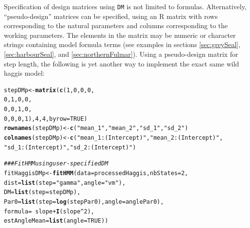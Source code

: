 \documentclass[12pt]{article}\usepackage[]{graphicx}\usepackage[]{xcolor}
\makeatletter
\newcommand{\hlnum}[1]{\textcolor[rgb]{0.686,0.059,0.569}{#1}}%
\newcommand{\hlsng}[1]{\textcolor[rgb]{0.192,0.494,0.8}{#1}}%
\newcommand{\hlcom}[1]{\textcolor[rgb]{0.678,0.584,0.686}{\textit{#1}}}%
\newcommand{\hlopt}[1]{\textcolor[rgb]{0,0,0}{#1}}%
\newcommand{\hldef}[1]{\textcolor[rgb]{0.345,0.345,0.345}{#1}}%
\newcommand{\hlkwb}[1]{\textcolor[rgb]{0.69,0.353,0.396}{#1}}%
\newcommand{\hlkwc}[1]{\textcolor[rgb]{0.333,0.667,0.333}{#1}}%
\newcommand{\hlkwd}[1]{\textcolor[rgb]{0.737,0.353,0.396}{\textbf{#1}}}%
\newenvironment{kframe}{%
 \def\at@end@of@kframe{}%
 \ifinner\ifhmode%
  \def\at@end@of@kframe{\end{minipage}}%
  \begin{minipage}{\columnwidth}%
 \fi\fi%
 \def\FrameCommand##1{\hskip\@totalleftmargin \hskip-\fboxsep
 \colorbox{shadecolor}{##1}\hskip-\fboxsep
     \hskip-\linewidth \hskip-\@totalleftmargin \hskip\columnwidth}%
 \MakeFramed {\advance\hsize-\width
   \@totalleftmargin\z@ \linewidth\hsize
   \@setminipage}}%
 {\par\unskip\endMakeFramed%
 \at@end@of@kframe}
\newenvironment{knitrout}{}{} %
\makeatother
\begin{document}
Specification of design matrices using \verb|DM| is not limited to formulas. Alternatively, ``pseudo-design'' matrices can be specified, using an R matrix with rows corresponding to the natural parameters and columns corresponding to the working parameters. The elements in the matrix may be numeric or character strings containing model formula terms (see examples in sections \ref{sec:greySeal}, \ref{sec:harbourSeal}, and \ref{sec:northernFulmar}). Using a pseudo-design matrix for step length, the following is yet another way to implement the exact same wild haggis model:
\begin{knitrout}
\color{fgcolor}\begin{kframe}
\begin{alltt}
\hldef{stepDMp} \hlkwb{<-} \hlkwd{matrix}\hldef{(}\hlkwd{c}\hldef{(}\hlnum{1}\hldef{,}\hlnum{0}\hldef{,}\hlnum{0}\hldef{,}\hlnum{0}\hldef{,}
                   \hlnum{0}\hldef{,}\hlnum{1}\hldef{,}\hlnum{0}\hldef{,}\hlnum{0}\hldef{,}
                   \hlnum{0}\hldef{,}\hlnum{0}\hldef{,}\hlnum{1}\hldef{,}\hlnum{0}\hldef{,}
                   \hlnum{0}\hldef{,}\hlnum{0}\hldef{,}\hlnum{0}\hldef{,}\hlnum{1}\hldef{),}\hlnum{4}\hldef{,}\hlnum{4}\hldef{,}\hlkwc{byrow}\hldef{=}\hlnum{TRUE}\hldef{)}
\hlkwd{rownames}\hldef{(stepDMp)} \hlkwb{<-} \hlkwd{c}\hldef{(}\hlsng{"mean_1"}\hldef{,}\hlsng{"mean_2"}\hldef{,}\hlsng{"sd_1"}\hldef{,}\hlsng{"sd_2"}\hldef{)}
\hlkwd{colnames}\hldef{(stepDMp)} \hlkwb{<-} \hlkwd{c}\hldef{(}\hlsng{"mean_1:(Intercept)"}\hldef{,}\hlsng{"mean_2:(Intercept)"}\hldef{,}
                      \hlsng{"sd_1:(Intercept)"}\hldef{,}\hlsng{"sd_2:(Intercept)"}\hldef{)}

\hlcom{### Fit HMM	using user-specified DM}
\hldef{fitHaggisDMp} \hlkwb{<-} \hlkwd{fitHMM}\hldef{(}\hlkwc{data} \hldef{= processedHaggis,} \hlkwc{nbStates} \hldef{=} \hlnum{2}\hldef{,}
                       \hlkwc{dist} \hldef{=} \hlkwd{list}\hldef{(}\hlkwc{step} \hldef{=} \hlsng{"gamma"}\hldef{,} \hlkwc{angle} \hldef{=} \hlsng{"vm"}\hldef{),}
                       \hlkwc{DM} \hldef{=} \hlkwd{list}\hldef{(}\hlkwc{step} \hldef{= stepDMp),}
                       \hlkwc{Par0} \hldef{=} \hlkwd{list}\hldef{(}\hlkwc{step} \hldef{=} \hlkwd{log}\hldef{(stepPar0),} \hlkwc{angle} \hldef{= anglePar0),}
                       \hlkwc{formula} \hldef{=} \hlopt{~} \hldef{slope} \hlopt{+} \hlkwd{I}\hldef{(slope}\hlopt{^}\hlnum{2}\hldef{),}
                       \hlkwc{estAngleMean} \hldef{=} \hlkwd{list}\hldef{(}\hlkwc{angle}\hldef{=}\hlnum{TRUE}\hldef{))}
\end{alltt}
\end{kframe}
\end{knitrout}
\end{document}
